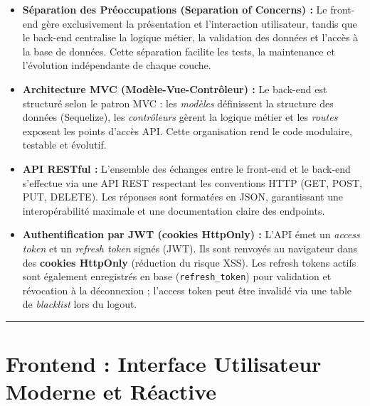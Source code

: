 \documentclass[12pt,a4paper,twoside,openright]{report}
\begin{document}
\begin{itemize}[label=\textcolor{primaryBlue}{$\bullet$}, leftmargin=1.5cm, itemsep=0.35cm]

    \item \textbf{Séparation des Préoccupations (Separation of Concerns) :}
    Le front-end gère exclusivement la présentation et l'interaction utilisateur, tandis que le back-end centralise la logique métier, la validation des données et l'accès à la base de données. Cette séparation facilite les tests, la maintenance et l'évolution indépendante de chaque couche.

    \item \textbf{Architecture MVC (Modèle-Vue-Contrôleur) :}
    Le back-end est structuré selon le patron MVC : les \textit{modèles} définissent la structure des données (Sequelize), les \textit{contrôleurs} gèrent la logique métier et les \textit{routes} exposent les points d'accès API. Cette organisation rend le code modulaire, testable et évolutif.

    \item \textbf{API RESTful :}
    L'ensemble des échanges entre le front-end et le back-end s'effectue via une API REST respectant les conventions HTTP (GET, POST, PUT, DELETE). Les réponses sont formatées en JSON, garantissant une interopérabilité maximale et une documentation claire des endpoints.

    \item \textbf{Authentification par JWT (cookies HttpOnly) :}
    L'API émet un \textit{access token} et un \textit{refresh token} signés (JWT). Ils sont renvoyés au navigateur dans des \textbf{cookies HttpOnly} (réduction du risque XSS). Les refresh tokens actifs sont également enregistrés en base (\texttt{refresh\_token}) pour validation et révocation à la déconnexion ; l'access token peut être invalidé via une table de \textit{blacklist} lors du logout.

\end{itemize}

\vspace{0.5cm}
\noindent\textcolor{primaryBlue!25}{\rule{\textwidth}{0.5pt}}
\vspace{0.4cm}

\section{Frontend : Interface Utilisateur Moderne et Réactive}
\end{document}

